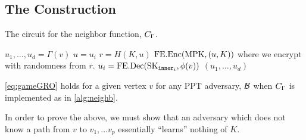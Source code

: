 \subsection{The Construction}
\begin{algorithm}[H]
	\caption{
		The circuit for the neighbor function, $C_\Gamma$.
	}
	\begin{algorithmic}[1]
			\State $u_1, \dots, u_d = \Gamma(v)$
			\State $u = u_i$
			\State $r = H(K, u)$
			\State \Return $\text{FE.Enc}(\text{MPK}, (u, K))$ where we encrypt with randomness from $r$.
		\EndFunction
				\State $u_i = \text{FE.Dec}(\text{SK}_{\texttt{inner}_i}, \phi(v))$
			\EndFor
			\State \Return $(u_1, \dots, u_d)$
		\EndFunction
	\end{algorithmic}
	\label{alg:neighb}
\end{algorithm}

\begin{claim} 
	\label{claim:sec}
	\cref{eq:gameGRO} holds for a given vertex $v$ for any PPT adversary, $\mathcal{B}$ when $C_\Gamma$ is implemented as in \cref{alg:neighb}.
\end{claim}
In order to prove the above, we must show that an adversary which does not know a path from $v$ to $v_1, \dots v_p$
essentially ``learns'' nothing of $K$.

